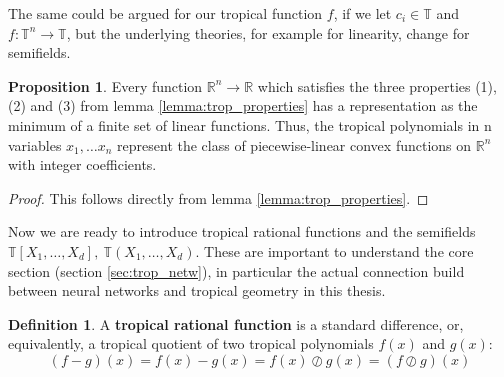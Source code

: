 \documentclass{article}
\theoremstyle{definition}
\newtheorem{definition}[theorem]{Definition}
\newtheorem{proposition}[theorem]{Proposition}
\begin{document}
The same could be argued for our tropical function $f$, if we let $c_{i} \in \mathbb{T}$ and $f:\mathbb{T}^{n} \to \mathbb{T}$, but the underlying theories, for example for linearity, change for semifields\cite{olia2020analysis}.

\begin{proposition}
Every function $\mathbb{R}^{n} \to \mathbb{R}$ which satisfies the three properties (1), (2) and (3) from lemma 	\ref{lemma:trop_properties} has a representation as the minimum of a finite set of linear functions. Thus, the tropical polynomials in n variables $x_{1}, \dots x_{n}$ represent the class of piecewise-linear convex functions on $\mathbb{R}^{n}$ with integer coefficients.
\end{proposition}

\begin{proof}
This follows directly from lemma \ref{lemma:trop_properties}.
\end{proof}

Now we are ready to introduce tropical rational functions and the semifields $\mathbb{T}[X_{1} , \dots , X_{d}], \ \mathbb{T}(X_{1} , \dots , X_{d})$. These are important to understand the core section (section \ref{sec:trop_netw}), in particular the actual connection build between neural networks and tropical geometry in this thesis.

\begin{definition} \cite[p.~3]{zhang2018tropical}
A \textbf{tropical rational function} is a standard difference, or, equivalently, a tropical quotient of two tropical polynomials $f(x)$ and $g(x)$:
$$ (f-g)(x) = f(x) - g(x) = f(x) \oslash g(x) = (f \oslash g)(x)$$
\end{definition}
\end{document}
